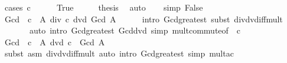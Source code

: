 \begin{isabellebody}
%
\isadelimproof
%
\endisadelimproof
%
\isatagproof
{}\isamarkupfalse%
\ {\isacharparenleft}{\kern0pt}cases\ {\isachardoublequoteopen}c\ {\isacharequal}{\kern0pt}\ {}{\isachardoublequoteclose}{\isacharparenright}{\kern0pt}\isanewline
\ \ \isamarkupfalse%
\ True\isanewline
\ \ \isamarkupfalse%
\ \isamarkupfalse%
\ {\isacharquery}{\kern0pt}thesis\ \isamarkupfalse%
\ auto\isanewline
{}\isamarkupfalse%
\isanewline
\ \ \isamarkupfalse%
\ {\isacharbrackleft}{\kern0pt}simp{\isacharbrackright}{\kern0pt}{\isacharcolon}{\kern0pt}\ False\isanewline
\ \ \isamarkupfalse%
\ {\isachardoublequoteopen}Gcd\ {\isacharparenleft}{\kern0pt}{\isacharparenleft}{\kern0pt}{\isacharasterisk}{\kern0pt}{\isacharparenright}{\kern0pt}\ c\ {\isacharbackquote}{\kern0pt}\ A{\isacharparenright}{\kern0pt}\ div\ c\ dvd\ Gcd\ A{\isachardoublequoteclose}\isanewline
\ \ \ \ \isamarkupfalse%
\ {\isacharparenleft}{\kern0pt}intro\ Gcd{\isacharunderscore}{\kern0pt}greatest{\isacharcomma}{\kern0pt}\ subst\ div{\isacharunderscore}{\kern0pt}dvd{\isacharunderscore}{\kern0pt}iff{\isacharunderscore}{\kern0pt}mult{\isacharparenright}{\kern0pt}\isanewline
\ \ \ \ \ \ \ {\isacharparenleft}{\kern0pt}auto\ intro{\isacharbang}{\kern0pt}{\isacharcolon}{\kern0pt}\ Gcd{\isacharunderscore}{\kern0pt}greatest\ Gcd{\isacharunderscore}{\kern0pt}dvd\ simp{\isacharcolon}{\kern0pt}\ mult{\isachardot}{\kern0pt}commute{\isacharbrackleft}{\kern0pt}of\ {\isacharunderscore}{\kern0pt}\ c{\isacharbrackright}{\kern0pt}{\isacharparenright}{\kern0pt}\isanewline
\ \ \isamarkupfalse%
\ \isamarkupfalse%
\ {\isachardoublequoteopen}Gcd\ {\isacharparenleft}{\kern0pt}{\isacharparenleft}{\kern0pt}{\isacharasterisk}{\kern0pt}{\isacharparenright}{\kern0pt}\ c\ {\isacharbackquote}{\kern0pt}\ A{\isacharparenright}{\kern0pt}\ dvd\ c\ {\isacharasterisk}{\kern0pt}\ Gcd\ A{\isachardoublequoteclose}\isanewline
\ \ \ \ \isamarkupfalse%
\ {\isacharparenleft}{\kern0pt}subst\ {\isacharparenleft}{\kern0pt}asm{\isacharparenright}{\kern0pt}\ div{\isacharunderscore}{\kern0pt}dvd{\isacharunderscore}{\kern0pt}iff{\isacharunderscore}{\kern0pt}mult{\isacharparenright}{\kern0pt}\ {\isacharparenleft}{\kern0pt}auto\ intro{\isacharcolon}{\kern0pt}\ Gcd{\isacharunderscore}{\kern0pt}greatest\ simp{\isacharcolon}{\kern0pt}\ mult{\isacharunderscore}{\kern0pt}ac{\isacharparenright}{\kern0pt}\isanewline
\ \ \isamarkupfalse%
\ \isamarkupfalse%

\end{isabellebody}
